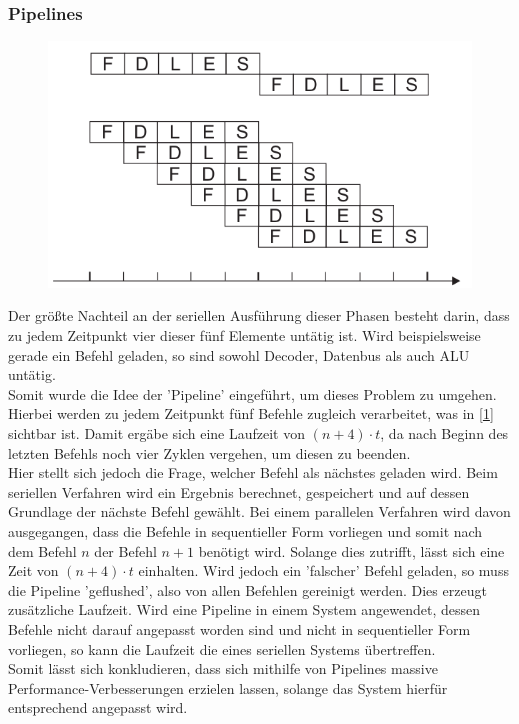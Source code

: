\subsubsection{Pipelines}
\begin{figure}
\centering
\includegraphics[scale=0.5]{images/pipeline.png}
\label{pipeline}
\end{figure}
Der größte Nachteil an der seriellen Ausführung dieser Phasen besteht darin, dass zu jedem Zeitpunkt vier dieser fünf Elemente untätig ist. Wird beispielsweise gerade ein Befehl geladen, so sind sowohl Decoder, Datenbus als auch ALU untätig.\\
Somit wurde die Idee der 'Pipeline' eingeführt, um dieses Problem zu umgehen. Hierbei werden zu jedem Zeitpunkt fünf Befehle zugleich verarbeitet, was in [\ref{pipeline}] sichtbar ist. Damit ergäbe sich eine Laufzeit von $(n+4) \cdot t$, da nach Beginn des letzten Befehls noch vier Zyklen vergehen, um diesen zu beenden.\\
Hier stellt sich jedoch die Frage, welcher Befehl als nächstes geladen wird. Beim seriellen Verfahren wird ein Ergebnis berechnet, gespeichert und auf dessen Grundlage der nächste Befehl gewählt. Bei einem parallelen Verfahren wird davon ausgegangen, dass die Befehle in sequentieller Form vorliegen und somit nach dem Befehl $n$ der Befehl $n+1$ benötigt wird. Solange dies zutrifft, lässt sich eine Zeit von $(n+4) \cdot t$ einhalten. Wird jedoch ein 'falscher' Befehl geladen, so muss die Pipeline 'geflushed', also von allen Befehlen gereinigt werden. Dies erzeugt zusätzliche Laufzeit. Wird eine Pipeline in einem System angewendet, dessen Befehle nicht darauf angepasst worden sind und nicht in sequentieller Form vorliegen, so kann die Laufzeit die eines seriellen Systems übertreffen.\\
Somit lässt sich konkludieren, dass sich mithilfe von Pipelines massive Performance-Verbesserungen erzielen lassen, solange das System hierfür entsprechend angepasst wird.

